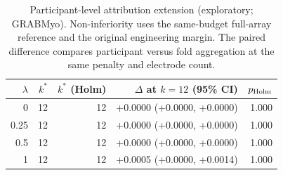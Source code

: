 \begin{table}[htbp]
\centering
\small
\caption{Participant-level attribution extension (exploratory; GRABMyo). Non-inferiority uses the same-budget full-array reference and the original engineering margin. The paired difference compares participant versus fold aggregation at the same penalty and electrode count.}
\label{tab:participant_extension}
\begin{tabular}{rrrrr}
\toprule
$\lambda$ & $k^*$ & $k^*$ (Holm) & $\Delta$ at $k=12$ (95\% CI) & $p_{\rm Holm}$ \\
\midrule
0 & 12 & 12 & +0.0000 (+0.0000, +0.0000) & 1.000 \\
0.25 & 12 & 12 & +0.0000 (+0.0000, +0.0000) & 1.000 \\
0.5 & 12 & 12 & +0.0000 (+0.0000, +0.0000) & 1.000 \\
1 & 12 & 12 & +0.0005 (+0.0000, +0.0014) & 1.000 \\
\bottomrule
\end{tabular}
\end{table}
